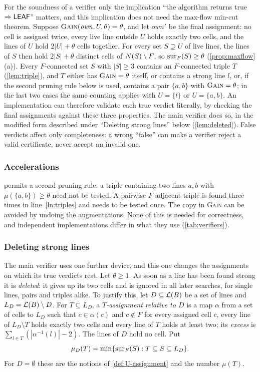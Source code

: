 \begin{remark}\label{rem:true-cert}
For the soundness of a verifier only the implication ``the algorithm returns true $\Rightarrow\mathsf{LEAF}$''
matters, and this implication does not need the max-flow min-cut theorem. Suppose
$\textsc{Gain}(\mathit{own},U,\theta)=\theta$, and let $\mathit{own}'$ be the final assignment: no cell is
assigned twice, every live line outside $U$ holds exactly two cells, and the lines of $U$ hold $2|U|+\theta$
cells together. For every set $S\supseteq U$ of live lines, the lines of $S$ then hold $2|S|+\theta$
distinct cells of $N(S)\setminus F$, so $\operatorname{sur}_F(S)\ge\theta$ (\cref{prop:maxflow}\,(a)). Every $F$-connected
set $S$ with $|S|\ge3$ contains an $F$-connected triple $T$ (\cref{lem:triple}), and $T$ either has
$\textsc{Gain}=\theta$ itself, or contains a strong line $l$, or, if the second pruning rule below is
used, contains a pair $\{a,b\}$ with $\textsc{Gain}=\theta$; in the last two cases the same counting
applies with $U=\{l\}$ or $U=\{a,b\}$. An implementation can therefore validate each true verdict
literally, by checking the final assignments against these three properties. The main verifier does
so, in the modified form described under ``Deleting strong lines'' below (\cref{lem:deleted}). False
verdicts affect only completeness: a wrong ``false'' can make a verifier reject a valid certificate,
never accept an invalid one.
\end{remark}

\subsubsection*{Accelerations}
 permits a second pruning rule: a triple containing two lines $a,b$ with
$\mu(\{a,b\})\ge\theta$ need not be tested. A pairwise $F$-adjacent triple is found three times in
line~\ref{ln:triples} and needs to be tested once. The copy in \textsc{Gain} can be avoided by undoing
the augmentations. None of this is needed for correctness, and independent implementations differ in what they use
(\cref{tab:verifiers}).

\subsubsection*{Deleting strong lines}
The main verifier uses one further device, and this one changes the assignments on which its true
verdicts rest. Let $\theta\ge1$. As soon as a line has been found strong it is \emph{deleted}: it gives
up its two cells and is ignored in all later searches, for single lines, pairs and triples alike. To
justify this, let $D\subseteq\mathcal{L}(B)$ be a set of lines and $L_D=\mathcal{L}(B)\setminus D$. For
$T\subseteq L_D$, a \emph{$T$-assignment relative to $D$} is a map $\alpha$ from a set of cells to $L_D$
such that $c\in\alpha(c)$ and $c\notin F$ for every assigned cell $c$, every line of $L_D\setminus T$
holds exactly two cells and every line of $T$ holds at least two; its \emph{excess} is
$\sum_{l\in T}(|\alpha^{-1}(l)|-2)$. The lines of $D$ hold no cell. Put
\[
  \mu_D(T)=\min\{\operatorname{sur}_F(S) : T\subseteq S\subseteq L_D\}.
\]
For $D=\emptyset$ these are the notions of \cref{def:U-assignment} and the number $\mu(T)$.

